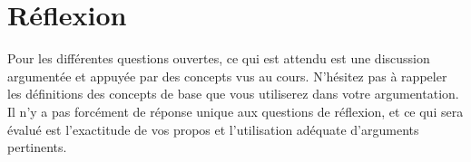 \chapter{Réflexion}
Pour les différentes questions ouvertes, ce qui est attendu est une discussion argumentée et appuyée
par des concepts vus au cours. N’hésitez pas à rappeler les définitions des concepts de base que vous
utiliserez dans votre argumentation. Il n’y a pas forcément de réponse unique aux questions de réflexion,
et ce qui sera évalué est l’exactitude de vos propos et l’utilisation adéquate d’arguments pertinents.
\paragraph{}
\begin{enumerate}\setlength\itemsep{1em}


\end{enumerate}






